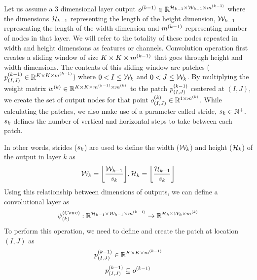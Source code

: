Let us assume a 3 dimensional layer output $o^{(k-1)} \in \mathbb{R}^{\mathcal{H}_{k-1} \times \mathcal{W}_{k-1} \times m^{(k-1)}}$ where the dimensions $\mathcal{H}_{k-1}$ representing the length of the height dimension, $\mathcal{W}_{k-1}$ representing the length of the width dimension and $m^{(k-1)}$ representing number of nodes in that layer. We will refer to the totality of these nodes repeated in width and height dimensions as features or channels. Convolution operation first creates a sliding window of size $K \times K \times m^{(k-1)}$ that goes through height and width dimensions. The contents of this sliding window are patches ($p^{(k-1)}_{(I,J)} \in \mathbb{R}^{K \times K \times m^{(k-1)}}$) where $0 < I \leq \mathcal{W}_{k}$ and $0 < J \leq \mathcal{W}_{k}$. By multiplying the weight matrix $w^{(k)} \in \mathbb{R}^{K \times K \times m^{(k-1)} \times m^{(k)}}$ to the patch $p^{(k-1)}_{(I,J)}$  centered at $(I,J)$, we create the set of output nodes for that point $o^{(k)}_{(I,J)} \in \mathbb{R}^{1 \times m^{(k)}}$. While calculating the patches, we also make use of a parameter called stride, $s_{k} \in \mathbb{N}^+$. $s_{k}$ defines the number of vertical and horizontal steps to take between each patch.

In other words, strides ($s_{k}$) are used to define the width ($\mathcal{W}_{k}$) and height ($\mathcal{H}_{k}$) of the output in layer $k$ as
$$ \widthk{k} = \floor*{\frac{\widthk{k-1}}{\sk{k}}}, \heightk{k} = \floor*{\frac{\heightk{k-1}}{\sk{k}}}$$
Using this relationship between dimensions of outputs, we can define a convolutional layer as
$$ \psi^{(Conv)}_{(k)} : \mathbb{R}^{\mathcal{H}_{k-1} \times \mathcal{W}_{k-1} \times m^{(k-1)} } \rightarrow \mathbb{R}^{\mathcal{H}_{k} \times \mathcal{W}_{k} \times m^{(k)} } $$
To perform this operation, we need to define and create the patch at location $(I,J)$ as 
$$ p^{(k-1)}_{(I,J)} \in \mathbb{R}^{K \times K \times m^{(k-1)}} $$
$$ p^{(k-1)}_{(I,J)} \subseteq o^{(k-1)}$$

